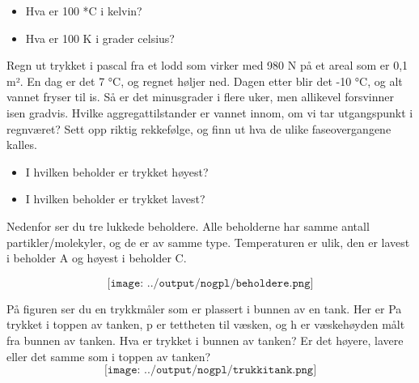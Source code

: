 \documentclass[12pt,a4paper]{article}
\def\oppgave{
		}
\begin{document}
\begin{itemize}
	\item Hva er 100 *C i kelvin?
	\item Hva er 100 K i grader celsius?

\end{itemize}
\vskip 5pt 
\vskip 2.5pt 
\oppgave{}%
\vskip 2.5pt 
Regn ut trykket i pascal fra et lodd som virker med 980 N på et areal som er 0,1 m². En dag er det 7 °C, og regnet høljer ned. Dagen etter blir det -10 °C, og alt vannet fryser til is. Så er det minusgrader i flere uker, men allikevel forsvinner isen gradvis. Hvilke aggregattilstander er vannet innom, om vi tar utgangspunkt i regnværet? Sett opp riktig rekkefølge, og finn ut hva de ulike faseovergangene kalles.

\begin{itemize}
	\item I hvilken beholder er trykket høyest?
	\item I hvilken beholder er trykket lavest?

\end{itemize}
\vskip 5pt 
\vskip 2.5pt 
\oppgave{}%
\vskip 2.5pt 
Nedenfor ser du tre lukkede beholdere. Alle beholderne har samme antall partikler/molekyler, og de er av samme type. Temperaturen er ulik, den er lavest i beholder A og høyest i beholder C.

$$\texttt{[image: ../output/nogpl/beholdere.png]}$$
\vskip 5pt 
\vskip 2.5pt 
\oppgave{}%
\vskip 2.5pt 
På figuren ser du en trykkmåler som er plassert i bunnen av en tank. Her er Pa trykket i toppen av tanken, p er tettheten til væsken, og h er væskehøyden målt fra bunnen av tanken. Hva er trykket i bunnen av tanken? Er det høyere, lavere eller det samme som i toppen av tanken?\\

$$\texttt{[image: ../output/nogpl/trukkitank.png]}$$
\vskip 5pt 
\vskip 2.5pt 
\end{document}
